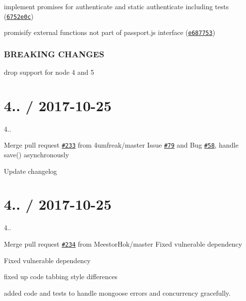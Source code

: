 \begin{DoxyItemize}
\item implement promises for authenticate and static authenticate including tests (\href{https://github.com/saintedlama/passport-local-mongoose/commit/6752e0c}{\tt 6752e0c})
\item promisify external functions not part of passport.\+js interface (\href{https://github.com/saintedlama/passport-local-mongoose/commit/e687753}{\tt e687753})
\end{DoxyItemize}

\subsubsection*{B\+R\+E\+A\+K\+I\+NG C\+H\+A\+N\+G\+ES}


\begin{DoxyItemize}
\item drop support for node 4 and 5
\end{DoxyItemize}

\section*{4.. / 2017-\/10-\/25 }


\begin{DoxyItemize}
\item 4..
\item Merge pull request \href{https://github.com/saintedlama/passport-local-mongoose/issues/233}{\tt \#233} from 4umfreak/master Issue \href{https://github.com/saintedlama/passport-local-mongoose/issues/79}{\tt \#79} and Bug \href{https://github.com/saintedlama/passport-local-mongoose/issues/58}{\tt \#58}, handle save() asynchronously
\item Update changelog
\end{DoxyItemize}

\section*{4.. / 2017-\/10-\/25 }


\begin{DoxyItemize}
\item 4..
\item Merge pull request \href{https://github.com/saintedlama/passport-local-mongoose/issues/234}{\tt \#234} from Meestor\+Hok/master Fixed vulnerable dependency
\item Fixed vulnerable dependency
\item fixed up code tabbing style differences
\item added code and tests to handle mongoose errors and concurrency gracefully.
\end{DoxyItemize}

